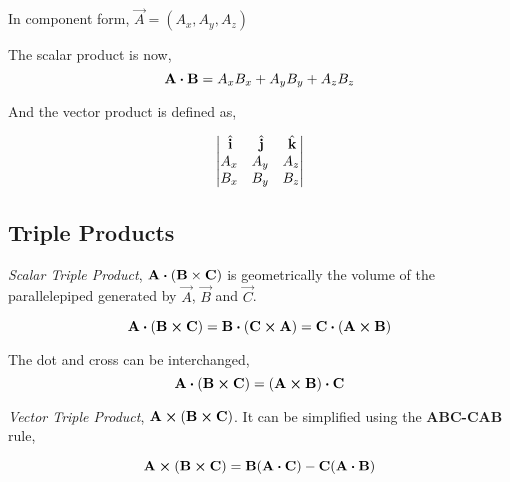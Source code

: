 In component form,
\(\vec{A} = (A_x, A_y, A_z)\)

The scalar product is now,
\[
    \vec{A} \dtp \vec{B} = A_xB_x + A_yB_y + A_zB_z
\]

And the vector product is defined as, 

\[
\begin{vmatrix}
    \,{\hat{\boldsymbol{\mathbf{i}}}} & \,{\hat{\boldsymbol{\mathbf{j}}}} & \,{\hat{\boldsymbol{\mathbf{k}}}} \\
    A_x & A_y & A_z \\
    B_x & B_y & B_z
\end{vmatrix}
\]

\subsection{Triple Products}

\emph{Scalar Triple Product}, \(\vec{A} \dtp (\vec{B} \times \vec{C})\) is geometrically
the volume of the parallelepiped generated by \(\vec{A}\), \(\vec{B}\) and \(\vec{C}\). 

\[
    \vec{A} \dtp (\vec{B} \cp \vec{C}) = \vec{B} \dtp (\vec{C} \cp \vec{A}) 
    = \vec{C} \dtp (\vec{A} \cp \vec{B}) 
\]

The dot and cross can be interchanged,
\[
    \vec{A} \dtp (\vec{B} \cp \vec{C}) = (\vec{A} \cp \vec{B}) \dtp \vec{C}
\]

\noindent \emph{Vector Triple Product}, \(\vec{A} \cp (\vec{B} \cp \vec{C})\). It can
be simplified using the \textbf{ABC-CAB} rule,

\[
    \vec{A} \cp (\vec{B} \cp \vec{C}) = \vec{B}(\vec{A} \dtp \vec{C}) -
    \vec{C}(\vec{A} \dtp \vec{B})
\]



